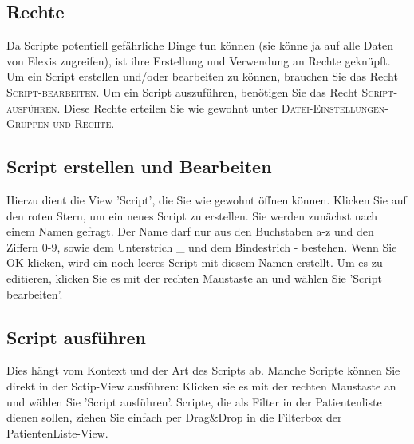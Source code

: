 \documentclass[a4paper]{scrartcl}
\begin{document}
\subsection{Rechte}
Da Scripte potentiell gefährliche Dinge tun können (sie könne ja auf alle Daten von Elexis zugreifen), ist ihre Erstellung und Verwendung an Rechte geknüpft. Um ein Script erstellen und/oder bearbeiten zu können, brauchen Sie das Recht \textsc{Script-bearbeiten}. Um ein Script auszuführen, benötigen Sie das Recht \textsc{Script-ausführen}. Diese Rechte erteilen Sie wie gewohnt unter \textsc{Datei-Einstellungen-Gruppen und Rechte}.

\subsection{Script erstellen und Bearbeiten}

Hierzu dient die View 'Script', die Sie wie gewohnt öffnen können. Klicken Sie auf den roten Stern, um ein neues Script zu erstellen. Sie werden zunächst nach einem Namen gefragt. Der Name darf nur aus den Buchstaben a-z und den Ziffern 0-9, sowie dem Unterstrich \_ und dem Bindestrich - bestehen. Wenn Sie OK klicken, wird ein noch leeres Script mit diesem Namen erstellt. Um es zu editieren, klicken Sie es mit der rechten Maustaste an und wählen Sie 'Script bearbeiten'.

\subsection{Script ausführen}

Dies hängt vom Kontext und der Art des Scripts ab. Manche Scripte können Sie direkt in der Sctip-View ausführen: Klicken sie es mit der rechten Maustaste an und wählen Sie 'Script ausführen'.
Scripte, die als Filter in der Patientenliste dienen sollen, ziehen Sie einfach per Drag\&Drop in die Filterbox der PatientenListe-View.

\vspace{3mm}
\end{document}
